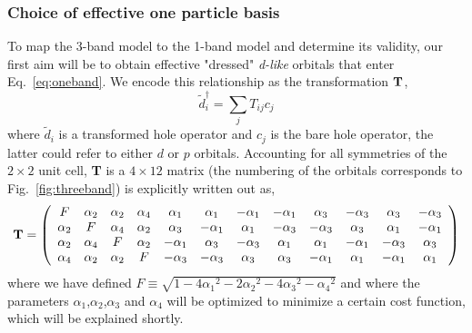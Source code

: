\documentclass[prl,12pt,onecolumn,nofootinbib,notitlepage,english,superscriptaddress]{revtex4-1}
\newcommand{\HJC}[1]{{\color{RED}{\bf HJC: #1}}}
\begin{document}
%

\subsubsection{Choice of effective one particle basis}
To map the 3-band model to the 1-band model and determine its validity, 
our first aim will be to obtain effective "dressed" \emph{d-like} 
orbitals that enter Eq.~\ref{eq:oneband}. We encode this relationship as 
the transformation ${\bf T}$, 
\begin{equation}
	\tilde{d}_i^{\dagger} = \sum_{j} T_{ij} c_j
\end{equation}
where $\tilde{d}_i$ is a transformed hole operator and $c_j$ is the bare hole
operator, the latter could refer to either $d$ or $p$ orbitals. Accounting for all symmetries of 
the $2\times2$ unit cell, {\bf T} is a $4 \times 12 $ matrix (the numbering of the orbitals 
corresponds to Fig.~\ref{fig:threeband}) is explicitly written out as, 
\begin{eqnarray}
{\bf T} = 
\left(
\begin{array}{cccccccccccc}
F        & \alpha_2 &        \alpha_2 &  \alpha_4 & \alpha_1 & \alpha_1 & -\alpha_1 & -\alpha_1 & \alpha_3 & -\alpha_3 & \alpha_3 & -\alpha_3 \\
\alpha_2 &  F       &        \alpha_4 &  \alpha_2 & \alpha_3 & -\alpha_1 & \alpha_1 & -\alpha_3 & -\alpha_3 & \alpha_3 & \alpha_1 & -\alpha_1 \\
\alpha_2 & \alpha_4 & F               &  \alpha_2 & -\alpha_1 & \alpha_3 & -\alpha_3 & \alpha_1 & \alpha_1 & -\alpha_1 & -\alpha_3 & \alpha_3 \\
\alpha_4 & \alpha_2 & \alpha_2        &   F       & -\alpha_3 & -\alpha_3 & \alpha_3 & \alpha_3 & -\alpha_1 & \alpha_1 & -\alpha_1 & \alpha_1 \\
\end{array}
\right)
\end{eqnarray}
where we have defined $F \equiv \sqrt{1-4{\alpha_1}^2 - 2{\alpha_2}^2 - 4 {\alpha_3}^2 -{\alpha_4}^2}$ and 
where the parameters $\alpha_1$,$\alpha_2$,$\alpha_3$ and $\alpha_4$ will be 
optimized to minimize a certain cost function, which will be explained shortly. 
\end{document}
